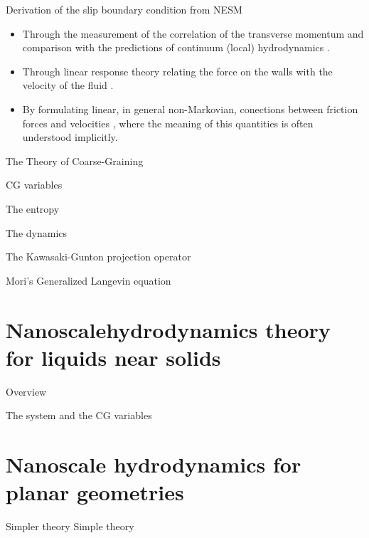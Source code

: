 \documentclass{beamer}
\begin{document}
\begin{frame}{Derivation of the slip boundary condition from NESM}
\begin{itemize}
\item Through the  measurement of the correlation of
the  transverse  momentum  and  comparison  with  the  predictions  of
continuum  (local) hydrodynamics  \cite{Bocquet1993,Chen2015}.
\item Through
linear  response theory  relating  the  force on  the  walls with  the
velocity   of  the   fluid   \cite{Bocquet1993,Petravic2007}.
\item By formulating  linear,  in  general  non-Markovian,  conections  between
friction forces and velocities \cite{Hansen2011}, where the meaning of
this quantities is often understood implicitly.
\end{itemize}
\end{frame}

\begin{frame}{The Theory of Coarse-Graining}
\end{frame}

\begin{frame}{CG variables}
\end{frame}

\begin{frame}{The entropy}
\end{frame}

\begin{frame}{The dynamics}
\end{frame}

\begin{frame}{The Kawasaki-Gunton projection operator}
\end{frame}

\begin{frame}{Mori's Generalized Langevin equation}
\end{frame}

\section{Nanoscalehydrodynamics theory for liquids near solids}
\begin{frame}{Overview}
\end{frame}

\begin{frame}{The system and the CG variables}
\end{frame}

\section{Nanoscale hydrodynamics for planar geometries}
\begin{frame}{Simpler theory}
  Simple theory
\end{frame}
\end{document}
